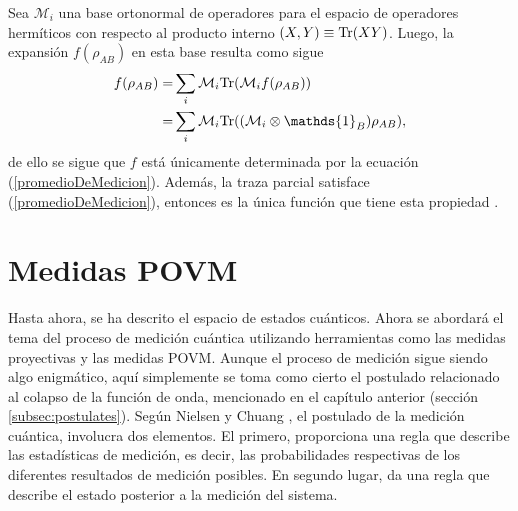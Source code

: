 Sea $\mathcal{M}_i$ una base ortonormal de operadores para el espacio de
operadores hermíticos con respecto al producto interno $(X,Y) \equiv {\rm Tr}(XY)$. Luego, la expansión $f (\rho_{AB} )$ en esta base resulta como sigue
\[\begin{split}
	f(\rho_{AB})=&\sum_{i}\mathcal{M}_i\tr(\mathcal{M}_i f(\rho_{AB}))\\
	=&\sum_{i}\mathcal{M}_i \tr((\mathcal{M}_i\otimes \mathds{1}_B)\rho_{AB}),\\
\end{split}\] 
de ello se sigue que $f$ está únicamente determinada por la ecuación
({\ref{promedioDeMedicion}}). Además, la traza parcial satisface
({\ref{promedioDeMedicion}}), entonces es la única función que tiene esta
propiedad {\cite{nielsen_chuang_2010}}.


\section{Medidas POVM}\label{sec:Cap1:MedidaPOVM} %
Hasta ahora, se ha descrito el espacio de estados cuánticos. Ahora se abordará
el tema del proceso de medición cuántica utilizando herramientas como las
medidas proyectivas y las medidas POVM\@. Aunque el proceso de medición  sigue siendo algo enigmático,
aquí simplemente se toma como cierto el postulado relacionado al colapso de la
función de onda, mencionado en el capítulo anterior (sección
{\ref{subsec:postulates}}). Según Nielsen y Chuang
{\cite{nielsen_chuang_2010}}, el postulado de la medición cuántica, involucra
dos elementos. El primero, proporciona una regla que describe las estadísticas
de medición, es decir, las probabilidades respectivas de los diferentes
resultados de medición posibles. En segundo lugar, da una regla que describe el
estado posterior a la medición del sistema.



